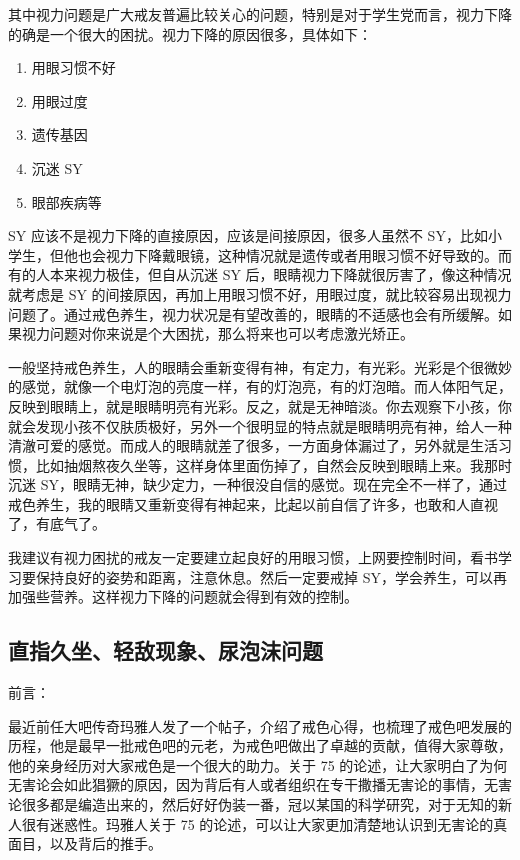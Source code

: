 \documentclass{ctexart}
\begin{document}
其中视力问题是广大戒友普遍比较关心的问题，特别是对于学生党而言，视力下降的确是一个很大的困扰。视力下降的原因很多，具体如下：

\begin{enumerate}
    \item 用眼习惯不好
    \item 用眼过度
    \item 遗传基因
    \item 沉迷 SY
    \item 眼部疾病等
\end{enumerate}

SY 应该不是视力下降的直接原因，应该是间接原因，很多人虽然不 SY，比如小学生，但他也会视力下降戴眼镜，这种情况就是遗传或者用眼习惯不好导致的。而有的人本来视力极佳，但自从沉迷 SY 后，眼睛视力下降就很厉害了，像这种情况就考虑是 SY 的间接原因，再加上用眼习惯不好，用眼过度，就比较容易出现视力问题了。通过戒色养生，视力状况是有望改善的，眼睛的不适感也会有所缓解。如果视力问题对你来说是个大困扰，那么将来也可以考虑激光矫正。

一般坚持戒色养生，人的眼睛会重新变得有神，有定力，有光彩。光彩是个很微妙的感觉，就像一个电灯泡的亮度一样，有的灯泡亮，有的灯泡暗。而人体阳气足，反映到眼睛上，就是眼睛明亮有光彩。反之，就是无神暗淡。你去观察下小孩，你就会发现小孩不仅肤质极好，另外一个很明显的特点就是眼睛明亮有神，给人一种清澈可爱的感觉。而成人的眼睛就差了很多，一方面身体漏过了，另外就是生活习惯，比如抽烟熬夜久坐等，这样身体里面伤掉了，自然会反映到眼睛上来。我那时沉迷 SY，眼睛无神，缺少定力，一种很没自信的感觉。现在完全不一样了，通过戒色养生，我的眼睛又重新变得有神起来，比起以前自信了许多，也敢和人直视了，有底气了。

我建议有视力困扰的戒友一定要建立起良好的用眼习惯，上网要控制时间，看书学习要保持良好的姿势和距离，注意休息。然后一定要戒掉 SY，学会养生，可以再加强些营养。这样视力下降的问题就会得到有效的控制。

\subsection{直指久坐、轻敌现象、尿泡沫问题}

前言：

最近前任大吧传奇玛雅人发了一个帖子，介绍了戒色心得，也梳理了戒色吧发展的历程，他是最早一批戒色吧的元老，为戒色吧做出了卓越的贡献，值得大家尊敬，他的亲身经历对大家戒色是一个很大的助力。关于 75 的论述，让大家明白了为何无害论会如此猖獗的原因，因为背后有人或者组织在专干撒播无害论的事情，无害论很多都是编造出来的，然后好好伪装一番，冠以某国的科学研究，对于无知的新人很有迷惑性。玛雅人关于 75 的论述，可以让大家更加清楚地认识到无害论的真面目，以及背后的推手。
\end{document}
